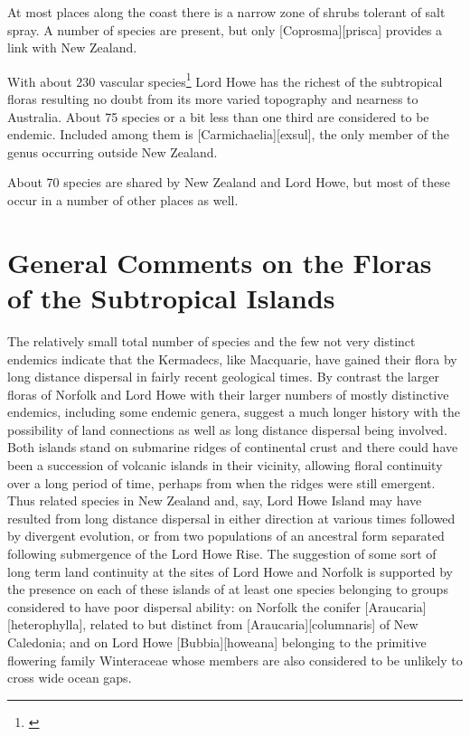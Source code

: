 At most places along the coast there is a narrow zone of shrubs tolerant of salt spray.
A number of species are present, but only [Coprosma][prisca] provides a link with New Zealand.

With about 230 vascular species\footnote{\cite{rodd1983census}} Lord Howe has the richest of the subtropical floras resulting no doubt from its more varied topography and nearness to Australia.
About 75 species or a bit less than one third are considered to be endemic.
Included among them is [Carmichaelia][exsul], the only member of the genus occurring outside New Zealand.

About 70 species are shared by New Zealand and Lord Howe, but most of these occur in a number of other places as well.

\section{General Comments on the Floras of the Subtropical Islands}

The relatively small total number of species and the few not very distinct endemics indicate that the Kermadecs, like Macquarie, have gained their flora by long distance dispersal in fairly recent geological times.
By contrast the larger floras of Norfolk and Lord Howe with their larger numbers of mostly distinctive endemics, including some endemic genera, suggest a much longer history with the possibility of land connections as well as long distance dispersal being involved.
Both islands stand on submarine ridges of continental crust and there could have been a succession of volcanic islands in their vicinity, allowing floral continuity over a long period of time, perhaps from when the ridges were still emergent.
Thus related species in New Zealand and, say, Lord Howe Island may have resulted from long distance dispersal in either direction at various times followed by divergent evolution, or from two populations of an ancestral form separated following submergence of the Lord Howe Rise.
The suggestion of some sort of long term land continuity at the sites of Lord Howe and Norfolk is supported by the presence on each of these islands of at least one species belonging to groups considered to have poor dispersal ability: on Norfolk the conifer [Araucaria][heterophylla], related to but distinct from [Araucaria][columnaris] of New Caledonia; and on Lord Howe [Bubbia][howeana] belonging to the primitive flowering family Winteraceae whose members are also considered to be unlikely to cross wide ocean gaps.

